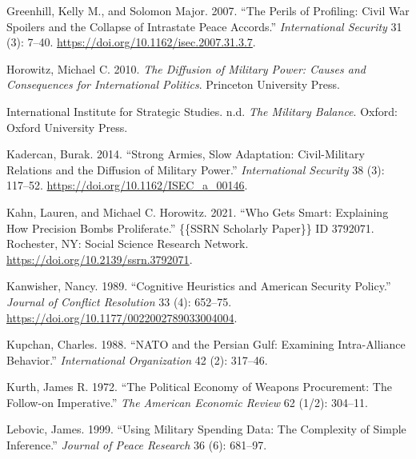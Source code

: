 \documentclass[
]{article}
\newlength{\cslhangindent}
\newlength{\cslentryspacingunit} %
\newenvironment{CSLReferences}[2] %
 {%
  \setlength{\parindent}{0pt}
  \ifodd #1
  \let\oldpar\par
  \def\par{\hangindent=\cslhangindent\oldpar}
  \fi
  \setlength{\parskip}{#2\cslentryspacingunit}
 }%
 {}
\begin{document}
\begin{CSLReferences}{1}{0}
\leavevmode{}%
Greenhill, Kelly M., and Solomon Major. 2007. {``The {Perils} of {Profiling}: {Civil War Spoilers} and the {Collapse} of {Intrastate Peace Accords}.''} \emph{International Security} 31 (3): 7--40. \url{https://doi.org/10.1162/isec.2007.31.3.7}.

\leavevmode{}%
Horowitz, Michael C. 2010. \emph{The {Diffusion} of {Military Power}: {Causes} and {Consequences} for {International Politics}}. {Princeton University Press}.

\leavevmode{}%
International Institute for Strategic Studies. n.d. \emph{The {Military Balance}}. {Oxford}: {Oxford University Press}.

\leavevmode{}%
Kadercan, Burak. 2014. {``Strong {Armies}, {Slow Adaptation}: {Civil-Military Relations} and the {Diffusion} of {Military Power}.''} \emph{International Security} 38 (3): 117--52. \url{https://doi.org/10.1162/ISEC_a_00146}.

\leavevmode{}%
Kahn, Lauren, and Michael C. Horowitz. 2021. {``Who {Gets Smart}: {Explaining How Precision Bombs Proliferate}.''} \{\{SSRN Scholarly Paper\}\} ID 3792071. {Rochester, NY}: {Social Science Research Network}. \url{https://doi.org/10.2139/ssrn.3792071}.

\leavevmode{}%
Kanwisher, Nancy. 1989. {``Cognitive {Heuristics} and {American Security Policy}.''} \emph{Journal of Conflict Resolution} 33 (4): 652--75. \url{https://doi.org/10.1177/0022002789033004004}.

\leavevmode{}%
Kupchan, Charles. 1988. {``{NATO} and the {Persian Gulf}: {Examining Intra-Alliance Behavior}.''} \emph{International Organization} 42 (2): 317--46.

\leavevmode{}%
Kurth, James R. 1972. {``The {Political Economy} of {Weapons Procurement}: {The Follow-on Imperative}.''} \emph{The American Economic Review} 62 (1/2): 304--11.

\leavevmode{}%
Lebovic, James. 1999. {``Using {Military Spending Data}: {The Complexity} of {Simple Inference}.''} \emph{Journal of Peace Research} 36 (6): 681--97.


\end{CSLReferences}
\end{document}
